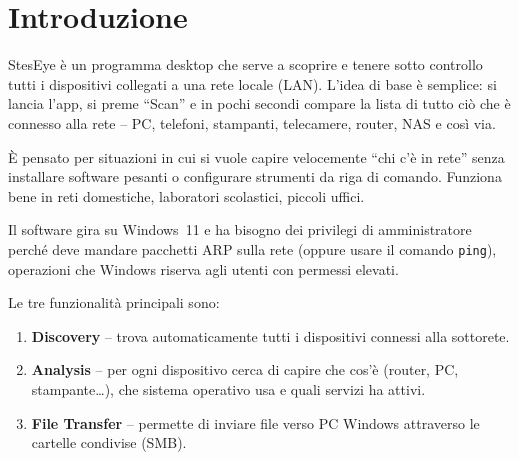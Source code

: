 \documentclass[a4paper,11pt]{article}
\begin{document}

\newpage

\tableofcontents
\newpage

\section{Introduzione}

StesEye è un programma desktop che serve a scoprire e tenere
sotto controllo tutti i dispositivi collegati a una rete locale
(LAN).  L'idea di base è semplice: si lancia l'app, si preme
``Scan'' e in pochi secondi compare la lista di tutto ciò che è
connesso alla rete -- PC, telefoni, stampanti, telecamere, router,
NAS e così via.

È pensato per situazioni in cui si vuole capire velocemente
``chi c'è in rete'' senza installare software pesanti o
configurare strumenti da riga di comando.  Funziona bene in reti
domestiche, laboratori scolastici, piccoli uffici.

Il software gira su Windows~11 e ha bisogno dei privilegi di
amministratore perché deve mandare pacchetti ARP sulla rete
(oppure usare il comando \texttt{ping}), operazioni che
Windows riserva agli utenti con permessi elevati.

Le tre funzionalità principali sono:

\begin{enumerate}[nosep]
  \item \textbf{Discovery} -- trova automaticamente tutti i
        dispositivi connessi alla sottorete.
  \item \textbf{Analysis} -- per ogni dispositivo cerca di capire
        che cos'è (router, PC, stampante\ldots), che sistema
        operativo usa e quali servizi ha attivi.
  \item \textbf{File Transfer} -- permette di inviare file verso
        PC Windows attraverso le cartelle condivise (SMB).
\end{enumerate}
\end{document}
